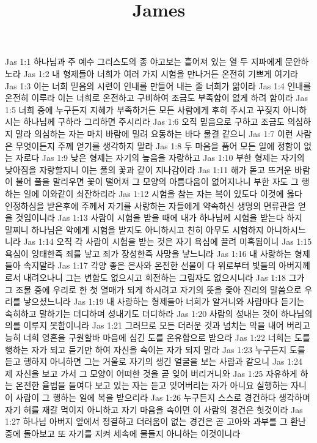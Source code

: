 

\title{James}

Jas 1:1  하나님과 주 예수 그리스도의 종 야고보는 흩어져 있는 열 두 지파에게 문안하노라
Jas 1:2  내 형제들아 너희가 여러 가지 시험을 만나거든 온전히 기쁘게 여기라
Jas 1:3  이는 너희 믿음의 시련이 인내를 만들어 내는 줄 너희가 앎이라
Jas 1:4  인내를 온전히 이루라 이는 너희로 온전하고 구비하여 조금도 부족함이 없게 하려 함이라
Jas 1:5  너희 중에 누구든지 지혜가 부족하거든 모든 사람에게 후히 주시고 꾸짖지 아니하시는 하나님께 구하라 그리하면 주시리라
Jas 1:6  오직 믿음으로 구하고 조금도 의심하지 말라 의심하는 자는 마치 바람에 밀려 요동하는 바다 물결 같으니
Jas 1:7  이런 사람은 무엇이든지 주께 얻기를 생각하지 말라
Jas 1:8  두 마음을 품어 모든 일에 정함이 없는 자로다
Jas 1:9  낮은 형제는 자기의 높음을 자랑하고
Jas 1:10  부한 형제는 자기의 낮아짐을 자랑할지니 이는 풀의 꽃과 같이 지나감이라
Jas 1:11  해가 돋고 뜨거운 바람이 불어 풀을 말리우면 꽃이 떨어져 그 모양의 아름다움이 없어지나니 부한 자도 그 행하는 일에 이와같이 쇠잔하리라
Jas 1:12  시험을 참는 자는 복이 있도다 이것에 옳다 인정하심을 받은후에 주께서 자기를 사랑하는 자들에게 약속하신 생명의 면류관을 얻을 것임이니라
Jas 1:13  사람이 시험을 받을 때에 내가 하나님께 시험을 받는다 하지 말찌니 하나님은 악에게 시험을 받지도 아니하시고 친히 아무도 시험하지 아니하시느니라
Jas 1:14  오직 각 사람이 시험을 받는 것은 자기 욕심에 끌려 미혹됨이니
Jas 1:15  욕심이 잉태한즉 죄를 낳고 죄가 장성한즉 사망을 낳느니라
Jas 1:16  내 사랑하는 형제들아 속지말라
Jas 1:17  각양 좋은 은사와 온전한 선물이 다 위로부터 빛들의 아버지께로서 내려오나니 그는 변함도 없으시고 회전하는 그림자도 없으시니라
Jas 1:18  그가 그 조물 중에 우리로 한 첫 열매가 되게 하시려고 자기의 뜻을 좇아 진리의 말씀으로 우리를 낳으셨느니라
Jas 1:19  내 사랑하는 형제들아 너희가 알거니와 사람마다 듣기는 속히하고 말하기는 더디하며 성내기도 더디하라
Jas 1:20  사람의 성내는 것이 하나님의 의를 이루지 못함이니라
Jas 1:21  그러므로 모든 더러운 것과 넘치는 악을 내어 버리고 능히 너희 영혼을 구원할바 마음에 심긴 도를 온유함으로 받으라
Jas 1:22  너희는 도를 행하는 자가 되고 듣기만 하여 자신을 속이는 자가 되지 말라
Jas 1:23  누구든지 도를 듣고 행하지 아니하면 그는 거울로 자기의 생긴 얼굴을 보는 사람과 같으니
Jas 1:24  제 자신을 보고 가서 그 모양이 어떠한 것을 곧 잊어 버리거니와
Jas 1:25  자유하게 하는 온전한 율법을 들여다 보고 있는 자는 듣고 잊어버리는 자가 아니요 실행하는 자니 이 사람이 그 행하는 일에 복을 받으리라
Jas 1:26  누구든지 스스로 경건하다 생각하며 자기 혀를 재갈 먹이지 아니하고 자기 마음을 속이면 이 사람의 경건은 헛것이라
Jas 1:27  하나님 아버지 앞에서 정결하고 더러움이 없는 경건은 곧 고아와 과부를 그 환난 중에 돌아보고 또 자기를 지켜 세속에 물들지 아니하는 이것이니라
